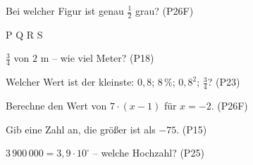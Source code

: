 \documentclass[11pt]{article}
\begin{document}
\small

\begin{aufgabe}{Bei welcher Figur ist genau $\frac{1}{2}$ grau? \hfill (P26F) \\    }

P  \quad Q  \quad R  \quad S 
\end{aufgabe}

\begin{aufgabe}{$\frac{3}{4}$ von $2$ m – wie viel Meter? \hfill (P18) \\ \leerfeld[m]}
\end{aufgabe}

\begin{aufgabe}{Welcher Wert ist der kleinste: $0{,}8$; $8\,\%$; $0{,}8^2$; $\frac{3}{4}$? \hfill (P23) \\ \leerfeld}
\end{aufgabe}

\begin{aufgabe}{Berechne den Wert von $7 \cdot (x - 1)$ für $x = -2$. \hfill (P26F) \\ \leerfeld}
\end{aufgabe}

\begin{aufgabe}{Gib eine Zahl an, die größer ist als $-75$. \hfill (P15) \\ \leerfeld}
\end{aufgabe}

\begin{aufgabe}{$3\,900\,000 = 3{,}9 \cdot 10^{\square}$ – welche Hochzahl? \hfill (P25) \\ \leerfeld}
\end{aufgabe}
\end{document}
